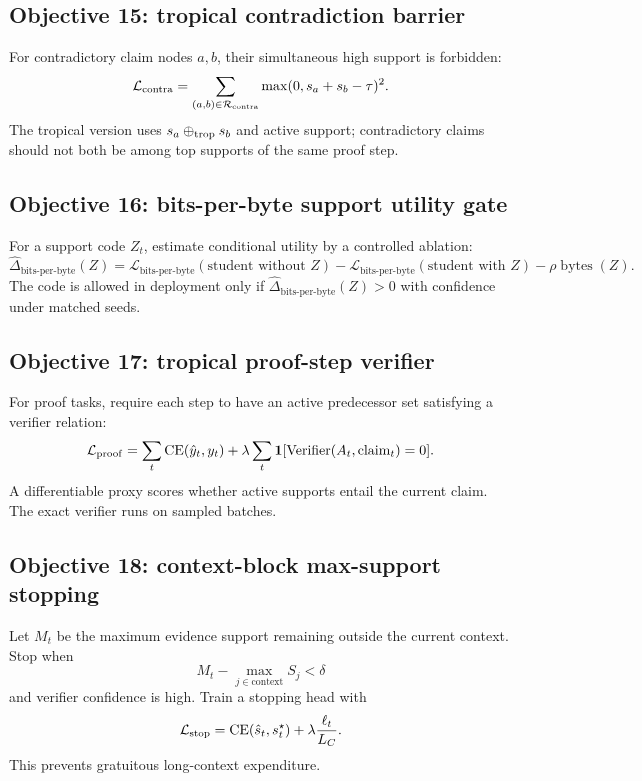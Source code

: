 \documentclass[11pt]{article}
\newcommand{\calL}{\mathcal{L}}
\newcommand{\calR}{\mathcal{R}}
\newcommand{\oplusT}{\oplus_{\rm trop}}
\newcommand{\bits}{\operatorname{bits\mbox{-}per\mbox{-}byte}}
\begin{document}
\subsection{Objective 15: tropical contradiction barrier}

For contradictory claim nodes \(a,b\), their simultaneous high support is forbidden:
\begin{equation}
\calL_{\rm contra}=\sum_{(a,b)\in\calR_{\rm contra}}\max(0,s_a+s_b-\tau)^2.
\end{equation}
The tropical version uses \(s_a\oplusT s_b\) and active support; contradictory claims should not both be among top supports of the same proof step.

\subsection{Objective 16: bits-per-byte support utility gate}

For a support code \(Z_t\), estimate conditional utility by a controlled ablation:
\begin{equation}
\widehat\Delta_{\bits}(Z)=\calL_{\bits}(\text{student without }Z)-\calL_{\bits}(\text{student with }Z)-\rho\operatorname{bytes}(Z).
\end{equation}
The code is allowed in deployment only if \(\widehat\Delta_{\bits}(Z)>0\) with confidence under matched seeds.

\subsection{Objective 17: tropical proof-step verifier}

For proof tasks, require each step to have an active predecessor set satisfying a verifier relation:
\begin{equation}
\calL_{\rm proof}=\sum_t\operatorname{CE}(\hat y_t,y_t)+\lambda\sum_t \mathbf{1}[\operatorname{Verifier}(A_t,\text{claim}_t)=0].
\end{equation}
A differentiable proxy scores whether active supports entail the current claim.  The exact verifier runs on sampled batches.

\subsection{Objective 18: context-block max-support stopping}

Let \(M_t\) be the maximum evidence support remaining outside the current context.  Stop when
\begin{equation}
M_t-\max_{j\in\text{context}}S_j<\delta
\end{equation}
and verifier confidence is high.  Train a stopping head with
\begin{equation}
\calL_{\rm stop}=\operatorname{CE}(\hat s_t,s_t^\star)+\lambda \frac{\ell_t}{L_C}.
\end{equation}
This prevents gratuitous long-context expenditure.
\end{document}

